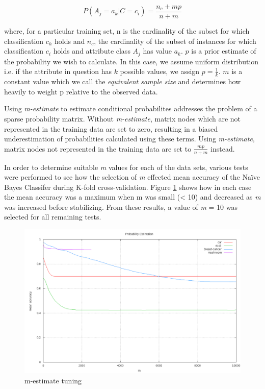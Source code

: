 \documentclass[10pt]{report}
\begin{document}
\begin{equation*}
P(A_{j}=a_{k}|C=c_{i}) = \frac{n_{c} + mp}{n + m}
\end{equation*}

where, for a particular training set, n is the cardinality of the
subset for which classification \(c_h\) holds and \(n_c\), the
cardinality of the subset of instances for which classification
\(c_i\) holds and attribute class \(A_j\) has value \(a_k\). \(p\) is
a prior estimate of the probability we wish to calculate. In this
case, we assume uniform distribution i.e. if the attribute in question
has \(k\) possible values, we assign \(p = \frac{1}{k}\). \(m\) is a
constant value which we call the \textit{equivalent sample size} and
determines how heavily to weight p relative to the observed
data. 

Using \textit{m-estimate} to estimate conditional probabilites
addresses the problem of a sparse probability matrix. Without
\textit{m-estimate}, matrix nodes which are not represented in the
training data are set to zero, resulting in a biased underestimation
of probabilities calculated using these terms. Using
\textit{m-estimate}, matrix nodes not represented in the training data
are set to \(\frac{mp}{n + m}\) instead.

In order to determine suitable \textit{m} values for each of the data
sets, various tests were performed to see how the selection of
\textit{m} effected mean accuracy of the Na\"{i}ve Bayes Classifer
during K-fold cross-validation. Figure \ref{fig:mlog} shows how in
each case the mean accuracy was a maximum when m was small (< 10) and
decreased as \textit{m} was increased before stabilizing. From these
results, a value of \textit{m} = 10 was selected for all remaining
tests.

\begin{figure}
  \begin{center}
	\includegraphics[width=\textwidth,height=!]{mlog}
  \end{center}
  \caption{m-estimate tuning}
  \label{fig:mlog}
\end{figure} 
\end{document}
